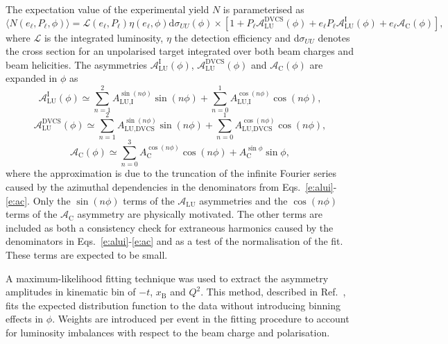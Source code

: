 The expectation value of the experimental yield $N$ is parameterised as
\begin{equation}
 \langle N(e_{\ell},P_{\ell},\phi)\rangle =
\mathcal{L}(e_{\ell},P_{\ell})\eta(e_{\ell},\phi)\textrm{d}\sigma_{UU}
(\phi)\times
[1+P_{\ell}\mathcal{A}_{\textrm{LU}}^{\textrm{DVCS}}(\phi)+e_{\ell}P_{\ell}
\mathcal{A}_{\textrm{LU}}^{\textrm{I}}(\phi)+e_{\ell}\mathcal{A}_{\textrm{C}}
(\phi)],
\end{equation}
where $\mathcal{L}$ is the integrated luminosity, $\eta$ the detection
efficiency and d$\sigma_{UU}$ denotes the
cross section for an unpolarised target integrated over both beam charges and
beam helicities. The asymmetries $\mathcal{A}_{\textrm{LU}}^{\textrm{I}}(\phi)$,
$\mathcal{A}_{\textrm{LU}}^{\textrm{DVCS}}(\phi)$ and
$\mathcal{A}_{\textrm{C}}(\phi)$ are expanded in
$\phi$ as
\begin{equation}
\mathcal{A}_{\textrm{LU}}^{\textrm{I}}(\phi) \simeq \sum^{2}_{n=1}
A_{\textrm{LU,I}}^{\sin(n\phi)}\sin(n\phi) 
+ \sum^{1}_{n=0} A_{\textrm{LU,I}}^{\cos(n\phi)}\cos(n\phi),
\label{alui_asym}
\end{equation}
\begin{equation}
 \mathcal{A}_{\textrm{LU}}^{\textrm{DVCS}}(\phi) \simeq \sum^{2}_{n=1}
A_{\textrm{LU,DVCS}}^{\sin(n\phi)}\sin(n\phi) 
+ \sum^{1}_{n=0} A_{\textrm{LU,DVCS}}^{\cos(n\phi)}\cos(n\phi),
\label{aludvcs_asym}
\end{equation}
\begin{equation}
\mathcal{A}_{\textrm{C}}(\phi) \simeq \sum^{3}_{n=0}
A_{\textrm{C}}^{\cos(n\phi)}\cos(n\phi) 
+ A_{\textrm{C}}^{\sin\phi}\sin\phi,
\label{ac_asym}
\end{equation}
where the approximation is due to the truncation of the infinite Fourier series
caused by the azimuthal dependencies in the denominators from
Eqs.~\ref{e:alui}-\ref{e:ac}. Only the $\sin(n\phi)$ terms of the
$\mathcal{A}_{\textrm{LU}}$ asymmetries and the $\cos(n\phi)$ terms of the
$\mathcal{A}_{\textrm{C}}$ asymmetry are physically motivated. The other terms
are included as both a consistency check for extraneous harmonics caused
by the denominators in Eqs.~\ref{e:alui}-\ref{e:ac} and as a test of the
normalisation of the fit. These terms are expected to be small.

A maximum-likelihood fitting technique \cite{Bar90} was used to
extract the asymmetry amplitudes in  kinematic bin of $-t$, $x_{\textrm{B}}$ and $Q^{2}$.
This method, described in Ref.~\cite{Air08}, fits the expected
 distribution function to the data without introducing binning effects in $\phi$.
Weights are introduced per event in the fitting procedure to account for
luminosity imbalances with respect to the beam charge and polarisation.

